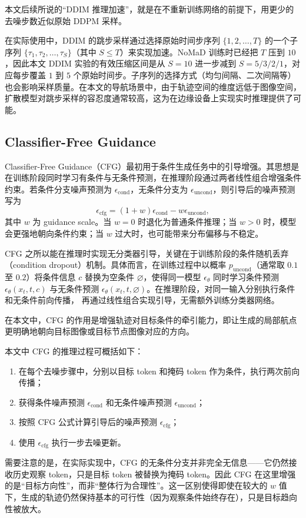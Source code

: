 本文后续所说的``DDIM 推理加速''，就是在不重新训练网络的前提下，用更少的去噪步数近似原始 DDPM 采样。

在实际使用中，DDIM 的跳步采样通过选择原始时间步序列 $\{1, 2, \ldots, T\}$ 的一个子序列 $\{\tau_1, \tau_2, \ldots, \tau_S\}$（其中 $S \le T$）来实现加速。NoMaD 训练时已经把 $T$ 压到 $10$，因此本文 DDIM 实验的有效压缩区间是从 $S = 10$ 进一步减到 $S = 5/3/2/1$，对应每步覆盖 $1$ 到 $5$ 个原始时间步。子序列的选择方式（均匀间隔、二次间隔等）也会影响采样质量。在本文的导航场景中，由于轨迹空间的维度远低于图像空间，扩散模型对跳步采样的容忍度通常较高，这为在边缘设备上实现实时推理提供了可能。

\subsection{Classifier-Free Guidance}

Classifier-Free Guidance（CFG）最初用于条件生成任务中的引导增强\cite{cfg2022}。其思想是在训练阶段同时学习有条件与无条件预测，在推理阶段通过两者线性组合增强条件约束。若条件分支噪声预测为 $\epsilon_{\text{cond}}$，无条件分支为 $\epsilon_{\text{uncond}}$，则引导后的噪声预测写为
\begin{equation}
\epsilon_{\text{cfg}} = (1+w)\epsilon_{\text{cond}} - w\epsilon_{\text{uncond}},
\end{equation}
其中 $w$ 为 guidance scale。当 $w=0$ 时退化为普通条件推理；当 $w>0$ 时，模型会更强地朝向条件约束；当 $w$ 过大时，也可能带来分布偏移与不稳定。

CFG 之所以能在推理时实现无分类器引导，关键在于训练阶段的条件随机丢弃（condition dropout）机制。具体而言，在训练过程中以概率 $p_{\text{uncond}}$（通常取 $0.1$ 至 $0.2$）将条件信息 $c$ 替换为空条件 $\varnothing$，使得同一模型 $\epsilon_\theta$ 同时学习条件预测 $\epsilon_\theta(x_t, t, c)$ 与无条件预测 $\epsilon_\theta(x_t, t, \varnothing)$。在推理阶段，对同一输入分别执行条件和无条件前向传播，
再通过线性组合实现引导，无需额外训练分类器网络。


在本文中，CFG 的作用是增强轨迹对目标条件的牵引能力，即让生成的局部航点更明确地朝向目标图像或目标节点图像对应的方向。

本文中 CFG 的推理过程可概括如下：
\begin{enumerate}
    \item 在每个去噪步骤中，分别以目标 token 和掩码 token 作为条件，执行两次前向传播；
    \item 获得条件噪声预测 $\epsilon_{\text{cond}}$ 和无条件噪声预测 $\epsilon_{\text{uncond}}$；
    \item 按照 CFG 公式计算引导后的噪声预测 $\epsilon_{\text{cfg}}$；
    \item 使用 $\epsilon_{\text{cfg}}$ 执行一步去噪更新。
\end{enumerate}
需要注意的是，在实际实现中，CFG 的无条件分支并非完全无信息——它仍然接收历史观察 token，只是目标 token 被替换为掩码 token。因此 CFG 在这里增强的是``目标方向性''，而非``整体行为合理性''。这一区别使得即使在较大的 $w$ 值下，生成的轨迹仍然保持基本的可行性（因为观察条件始终存在），只是目标趋向性被放大。

